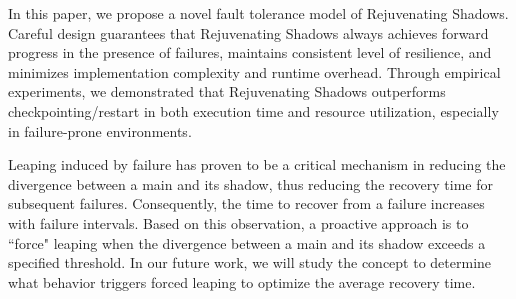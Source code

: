 
In this paper, we propose a novel fault tolerance model of Rejuvenating Shadows. %
Careful design guarantees that Rejuvenating Shadows always achieves forward progress in the presence of failures, maintains consistent level of resilience, and minimizes implementation complexity and runtime overhead. Through empirical experiments, we demonstrated that Rejuvenating Shadows outperforms checkpointing/restart in both execution time and resource utilization, especially in failure-prone environments.

Leaping induced by failure has proven to be a critical mechanism in reducing the divergence between a main and its shadow, 
thus reducing the recovery time for subsequent failures. Consequently, the time to recover from a failure increases with failure intervals.  
Based on this observation, a proactive approach is to ``force" leaping when the divergence between a main and its shadow exceeds a specified threshold. 
In our future work, we will study the concept to determine what behavior triggers forced leaping to optimize the average recovery time. 





